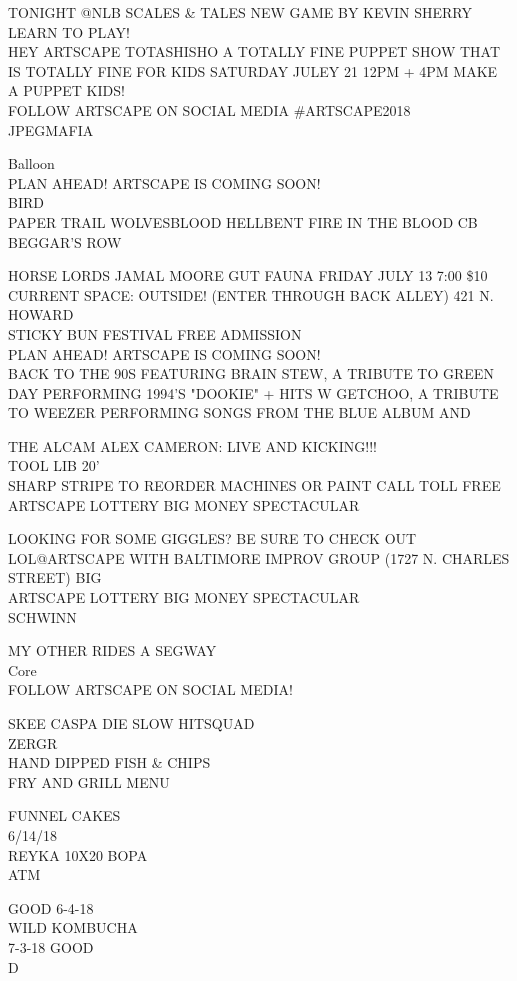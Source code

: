 \documentclass[10pt,letterpaper]{article}
\begin{document}
TONIGHT @NLB SCALES \& TALES NEW GAME BY KEVIN SHERRY LEARN TO PLAY!\\
HEY ARTSCAPE TOTASHISHO A TOTALLY FINE PUPPET SHOW THAT IS TOTALLY FINE FOR KIDS SATURDAY JULEY 21 12PM + 4PM MAKE A PUPPET KIDS!\\
FOLLOW ARTSCAPE ON SOCIAL MEDIA \#ARTSCAPE2018\\
JPEGMAFIA

Balloon\\
PLAN AHEAD!  ARTSCAPE IS COMING SOON!\\
BIRD\\
PAPER TRAIL WOLVESBLOOD HELLBENT FIRE IN THE BLOOD CB BEGGAR'S ROW

HORSE LORDS JAMAL MOORE GUT FAUNA FRIDAY JULY 13 7:00 \$10 CURRENT SPACE: OUTSIDE! (ENTER THROUGH BACK ALLEY) 421 N. HOWARD\\
STICKY BUN FESTIVAL FREE ADMISSION\\
PLAN AHEAD!  ARTSCAPE IS COMING SOON!\\
BACK TO THE 90S FEATURING BRAIN STEW, A TRIBUTE TO GREEN DAY PERFORMING 1994'S "DOOKIE" + HITS W GETCHOO, A TRIBUTE TO WEEZER PERFORMING SONGS FROM THE BLUE ALBUM AND

THE ALCAM ALEX CAMERON: LIVE AND KICKING!!!\\
TOOL LIB 20'\\
SHARP STRIPE TO REORDER MACHINES OR PAINT CALL TOLL FREE\\
ARTSCAPE LOTTERY BIG MONEY SPECTACULAR

LOOKING FOR SOME GIGGLES?  BE SURE TO CHECK OUT LOL@ARTSCAPE WITH BALTIMORE IMPROV GROUP (1727 N. CHARLES STREET) BIG\\
ARTSCAPE LOTTERY BIG MONEY SPECTACULAR\\
SCHWINN

MY OTHER RIDES A SEGWAY\\
Core\\
FOLLOW ARTSCAPE ON SOCIAL MEDIA!

SKEE CASPA DIE SLOW HITSQUAD\\
ZERGR\\
HAND DIPPED FISH \& CHIPS\\
FRY AND GRILL MENU

FUNNEL CAKES\\
6/14/18\\
REYKA 10X20 BOPA\\
ATM

GOOD 6{-}4{-}18\\
WILD KOMBUCHA\\
7{-}3{-}18 GOOD\\
D
\end{document}
